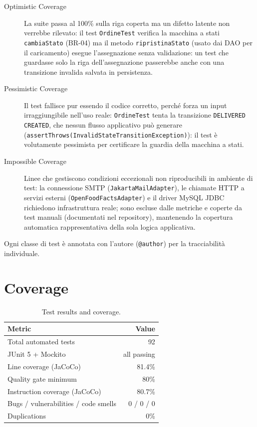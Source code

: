 \begin{description}
    \item[Optimistic Coverage] La suite passa al 100\% sulla riga coperta
    ma un difetto latente non verrebbe rilevato: il test \texttt{OrdineTest}
    verifica la macchina a stati \texttt{cambiaStato} (BR-04) ma il metodo
    \texttt{ripristinaStato} (usato dai DAO per il caricamento) esegue
    l'assegnazione senza validazione: un test che guardasse solo la riga
    dell'assegnazione passerebbe anche con una transizione invalida salvata
    in persistenza.
    \item[Pessimistic Coverage] Il test fallisce pur essendo il codice
    corretto, perché forza un input irraggiungibile nell'uso reale:
    \texttt{OrdineTest} tenta la transizione \texttt{DELIVERED}\textrightarrow
    \texttt{CREATED}, che nessun flusso applicativo pu\`o generare
    (\texttt{assertThrows(InvalidStateTransitionException)}): il test \`e
    volutamente pessimista per certificare la guardia della macchina a stati.
    \item[Impossible Coverage] Linee che gestiscono condizioni eccezionali
    non riproducibili in ambiente di test: la connessione SMTP
    (\texttt{JakartaMailAdapter}), le chiamate HTTP a servizi esterni
    (\texttt{OpenFoodFactsAdapter}) e il driver MySQL JDBC richiedono
    infrastruttura reale; sono escluse dalle metriche e coperte da test
    manuali (documentati nel repository), mantenendo la copertura automatica
    rappresentativa della sola logica applicativa.
\end{description}

Ogni classe di test \`e annotata con l'autore
(\texttt{@author}) per la tracciabilit\`a individuale.

\section{Coverage}

\begin{table}[H]
\centering
\caption{Test results and coverage.}
\label{tab:testing}
\begin{tabular}{@{}lr@{}}
\toprule
\textbf{Metric} & \textbf{Value} \\
\midrule
Total automated tests & 92 \\
JUnit 5 + Mockito & all passing \\
Line coverage (JaCoCo) & 81.4\% \\
Quality gate minimum & 80\% \\
Instruction coverage (JaCoCo) & 80.7\% \\
Bugs / vulnerabilities / code smells & 0 / 0 / 0 \\
Duplications & 0\% \\
\bottomrule
\end{tabular}
\end{table}

